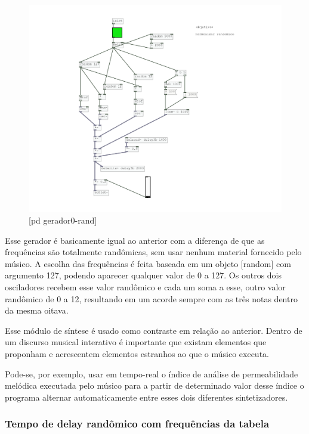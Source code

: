 \documentclass[draft]{ppgmus}
\begin{document}
\begin{figure}
\includegraphics[scale=.6]{gerador-sintese0-rand}
\caption{[pd gerador0-rand]}
\label{gerador0rand}
\end{figure}


Esse gerador é basicamente igual ao anterior com a diferença de que
as frequências são totalmente randômicas, sem usar nenhum material
fornecido pelo músico. A escolha das frequências é feita baseada em um
objeto [random] com argumento 127, podendo aparecer qualquer valor de 0 a 127.
Os outros dois osciladores recebem esse valor randômico e cada um soma a esse,
outro valor randômico de 0 a 12, resultando em um acorde sempre com as três
notas dentro da mesma oitava.

Esse módulo de síntese é usado como contraste em relação ao anterior.
Dentro de um discurso musical interativo é importante que existam elementos
que proponham e acrescentem elementos estranhos ao que o músico executa.

Pode-se, por exemplo, usar em tempo-real o índice de análise de permeabilidade 
melódica executada pelo músico para a partir de determinado valor desse índice
o programa alternar automaticamente entre esses dois diferentes sintetizadores.




\subsubsection{Tempo de delay randômico com frequências da tabela} 
\end{document}
